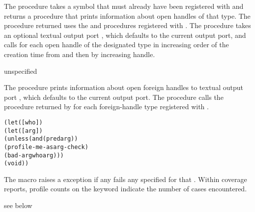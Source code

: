 The  procedure takes a symbol  that
must already have been registered with  and
returns a procedure that prints information about open handles of that type.
The procedure returned uses the  and 
procedures registered with .
The procedure takes an optional textual output port , which defaults
to the current output port, and calls  for each open handle of the
designated type in increasing order of the creation time from 
and then by increasing handle.

\begin{procedure}
\end{procedure}
\returns{} unspecified

The  procedure prints information about open
foreign handles to textual output port , which defaults to the current
output port.
The  procedure
calls the procedure returned by 
for each foreign-handle type registered with .

\begin{syntax}
\end{syntax}
\expandsto{}\begin{alltt}\antipar
(let ([who ])
  (let ([arg ])
    (unless (and (pred arg) \etc)
      (profile-me-as arg-check)
      (bad-arg who arg)))
  \etc
  (void))\end{alltt}

The  macro raises a  exception if
any  fails any  specified for that .
Within coverage reports, profile counts on the 
keyword indicate the number of  cases encountered.

\begin{procedure}
\end{procedure}
\returns{} see below

